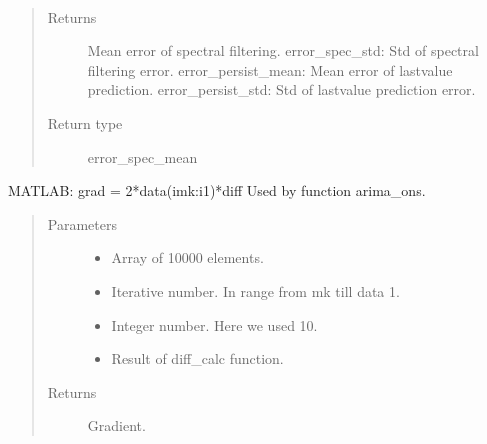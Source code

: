 \documentclass[letterpaper,10pt,english]{sphinxmanual}
\begin{document}
\begin{fulllineitems}
\label{\detokenize{LDS:LDS.OnlineLDS_library.error_stat}}~\begin{quote}\begin{description}
\item[{Returns}] \leavevmode
\sphinxAtStartPar
Mean error of spectral filtering.
error\_spec\_std:     Std of spectral filtering error.
error\_persist\_mean: Mean error of last\sphinxhyphen{}value prediction.
error\_persist\_std:  Std of last\sphinxhyphen{}value prediction error.

\item[{Return type}] \leavevmode
\sphinxAtStartPar
error\_spec\_mean

\end{description}\end{quote}

\end{fulllineitems}


\begin{fulllineitems}
\label{\detokenize{LDS:LDS.OnlineLDS_library.grad_calc}}
\sphinxAtStartPar
MATLAB: grad = 2*data(i\sphinxhyphen{}mk:i\sphinxhyphen{}1)*diff
Used by function arima\_ons.
\begin{quote}\begin{description}
\item[{Parameters}] \leavevmode\begin{itemize}
\item {} 
\sphinxAtStartPar
{} \textendash{} Array of 10000 elements.

\item {} 
\sphinxAtStartPar
{} \textendash{} Iterative number. In range from mk till data \sphinxhyphen{} 1.

\item {} 
\sphinxAtStartPar
{} \textendash{} Integer number. Here we used 10.

\item {} 
\sphinxAtStartPar
{} \textendash{} Result of diff\_calc function.

\end{itemize}

\item[{Returns}] \leavevmode
\sphinxAtStartPar
Gradient.

\end{description}\end{quote}

\end{fulllineitems}
\end{document}
